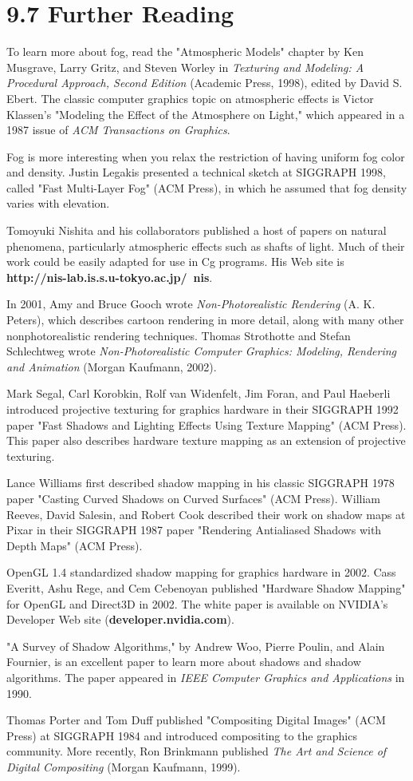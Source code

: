 \documentclass[../main.tex]{subfiles}
\begin{document}
\section{9.7 Further Reading}

To learn more about fog, read the "Atmospheric Models" chapter by Ken Musgrave, Larry Gritz, and Steven Worley in \textit{Texturing and Modeling: A Procedural Approach, Second Edition} (Academic Press, 1998), edited by David S. Ebert. The classic computer graphics topic on atmospheric effects is Victor Klassen's "Modeling the Effect of the Atmosphere on Light," which appeared in a 1987 issue of \textit{ACM Transactions on Graphics}.

Fog is more interesting when you relax the restriction of having uniform fog color and density. Justin Legakis presented a technical sketch at SIGGRAPH 1998, called "Fast Multi-Layer Fog" (ACM Press), in which he assumed that fog density varies with elevation.

Tomoyuki Nishita and his collaborators published a host of papers on natural phenomena, particularly atmospheric effects such as shafts of light. Much of their work could be easily adapted for use in Cg programs. His Web site is \textbf{http://nis-lab.is.s.u-tokyo.ac.jp/~nis}.

In 2001, Amy and Bruce Gooch wrote \textit{Non-Photorealistic Rendering} (A. K. Peters), which describes cartoon rendering in more detail, along with many other nonphotorealistic rendering techniques. Thomas Strothotte and Stefan Schlechtweg wrote \textit{Non-Photorealistic Computer Graphics: Modeling, Rendering and Animation} (Morgan Kaufmann, 2002).

Mark Segal, Carl Korobkin, Rolf van Widenfelt, Jim Foran, and Paul Haeberli introduced projective texturing for graphics hardware in their SIGGRAPH 1992 paper "Fast Shadows and Lighting Effects Using Texture Mapping" (ACM Press). This paper also describes hardware texture mapping as an extension of projective texturing.

Lance Williams first described shadow mapping in his classic SIGGRAPH 1978 paper "Casting Curved Shadows on Curved Surfaces" (ACM Press). William Reeves, David Salesin, and Robert Cook described their work on shadow maps at Pixar in their SIGGRAPH 1987 paper "Rendering Antialiased Shadows with Depth Maps" (ACM Press).

OpenGL 1.4 standardized shadow mapping for graphics hardware in 2002. Cass Everitt, Ashu Rege, and Cem Cebenoyan published "Hardware Shadow Mapping" for OpenGL and Direct3D in 2002. The white paper is available on NVIDIA's Developer Web site (\textbf{developer.nvidia.com}).

"A Survey of Shadow Algorithms," by Andrew Woo, Pierre Poulin, and Alain Fournier, is an excellent paper to learn more about shadows and shadow algorithms. The paper appeared in \textit{IEEE Computer Graphics and Applications} in 1990.

Thomas Porter and Tom Duff published "Compositing Digital Images" (ACM Press) at SIGGRAPH 1984 and introduced compositing to the graphics community. More recently, Ron Brinkmann published \textit{The Art and Science of Digital Compositing} (Morgan Kaufmann, 1999).
\end{document}

